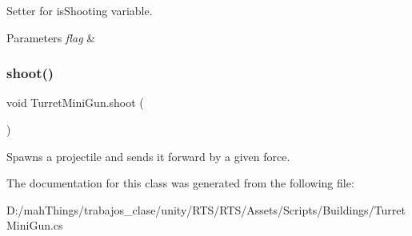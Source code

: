 Setter for is\+Shooting variable. 


\begin{DoxyParams}{Parameters}
{\em flag} & \\
\hline
\end{DoxyParams}
\mbox{\label{class_turret_mini_gun_a85ac788b061c745f1b920e749771ec1c}} 
\subsubsection{\texorpdfstring{shoot()}{shoot()}}
{\footnotesize\ttfamily void Turret\+Mini\+Gun.\+shoot (\begin{DoxyParamCaption}{ }\end{DoxyParamCaption})}



Spawns a projectile and sends it forward by a given force. 



The documentation for this class was generated from the following file\+:\begin{DoxyCompactItemize}
\item 
D\+:/mah\+Things/trabajos\+\_\+clase/unity/\+R\+T\+S/\+R\+T\+S/\+Assets/\+Scripts/\+Buildings/Turret\+Mini\+Gun.\+cs\end{DoxyCompactItemize}
